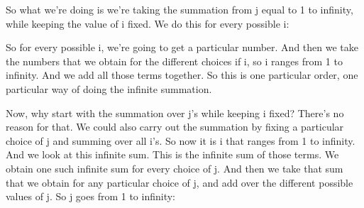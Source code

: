 \documentclass[pdftex, brazil, 12pt, twoside]{article}
\begin{document}
So what we're doing is we're taking the summation from j
equal to 1 to infinity, while keeping the value of i fixed.
We do this for every possible i:

\begin{figure}[H]
  \begin{center}
  \end{center}
\end{figure}

So for every possible i, we're going to get
a particular number.
And then we take the numbers that we obtain for the
different choices if i, so i ranges from 1 to infinity.
And we add all those terms together.
So this is one particular order, one particular way of
doing the infinite summation.

Now, why start with the summation over j's while
keeping i fixed?
There's no reason for that.
We could also carry out the summation by fixing a
particular choice of j and summing over all i's.
So now it is i that ranges from 1 to infinity.
And we look at this infinite sum.
This is the infinite sum of those terms.
We obtain one such infinite sum for every choice of j.
And then we take that sum that we obtain for any particular
choice of j, and add over the different
possible values of j.
So j goes from 1 to infinity:

\begin{figure}[H]
  \begin{center}
  \end{center}
\end{figure}
\end{document}
